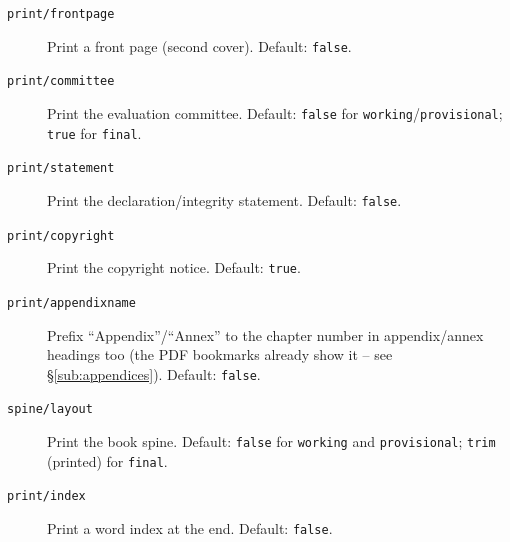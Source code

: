 \begin{description}
  \item[\texttt{print/frontpage}] Print a front page (second cover).
    Default: \texttt{false}.
\begin{latexcode}
\end{latexcode}

  \item[\texttt{print/committee}] Print the evaluation committee.
    Default: \texttt{false} for \texttt{working}/\texttt{provisional};
    \texttt{true} for \texttt{final}.
\begin{latexcode}
\end{latexcode}

  \item[\texttt{print/statement}] Print the declaration/integrity statement.
    Default: \texttt{false}.
\begin{latexcode}
\end{latexcode}

  \item[\texttt{print/copyright}] Print the copyright notice.
    Default: \texttt{true}.
\begin{latexcode}
\end{latexcode}

  \item[\texttt{print/appendixname}] Prefix ``Appendix''/``Annex'' to the
    chapter number in appendix/annex headings too (the PDF bookmarks
    already show it -- see \S\ref{sub:appendices}).
    Default: \texttt{false}.
\begin{latexcode}
\end{latexcode}

  \item[\texttt{spine/layout}] Print the book spine.
    Default: \texttt{false} for \texttt{working} and \texttt{provisional};
    \texttt{trim} (printed) for \texttt{final}.
\begin{latexcode}
\end{latexcode}

  \item[\texttt{print/index}] Print a word index at the end.
    Default: \texttt{false}.
\begin{latexcode}
\end{latexcode}


\end{description}
